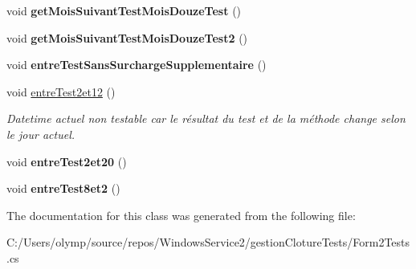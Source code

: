 \begin{DoxyCompactItemize}
\mbox{\label{classgestion_cloture_1_1_tests_1_1_form2_tests_ae8718aa9efe29a05e9a40a439a937639}} 
void {\bfseries get\+Mois\+Suivant\+Test\+Mois\+Douze\+Test} ()
\item 
\mbox{\label{classgestion_cloture_1_1_tests_1_1_form2_tests_a5f1d13e84b2452a2d848c311aa3b92c7}} 
void {\bfseries get\+Mois\+Suivant\+Test\+Mois\+Douze\+Test2} ()
\item 
\mbox{\label{classgestion_cloture_1_1_tests_1_1_form2_tests_a5f6df5b86baccd92be6cd8cd98c430fa}} 
void {\bfseries entre\+Test\+Sans\+Surcharge\+Supplementaire} ()
\item 
\mbox{\label{classgestion_cloture_1_1_tests_1_1_form2_tests_ad3fa2668c049d4801c7c19ec2248b736}} 
void \mbox{\hyperlink{classgestion_cloture_1_1_tests_1_1_form2_tests_ad3fa2668c049d4801c7c19ec2248b736}{entre\+Test2et12}} ()
\begin{DoxyCompactList}\small\item\em Datetime actuel non testable car le résultat du test et de la méthode change selon le jour actuel. \end{DoxyCompactList}\item 
\mbox{\label{classgestion_cloture_1_1_tests_1_1_form2_tests_a0f6b1466c06393f9fcfcd780c0b607a9}} 
void {\bfseries entre\+Test2et20} ()
\item 
\mbox{\label{classgestion_cloture_1_1_tests_1_1_form2_tests_a9008295c5e26657b549a34892b73ade9}} 
void {\bfseries entre\+Test8et2} ()
\end{DoxyCompactItemize}


The documentation for this class was generated from the following file\+:\begin{DoxyCompactItemize}
\item 
C\+:/\+Users/olymp/source/repos/\+Windows\+Service2/gestion\+Cloture\+Tests/Form2\+Tests.\+cs\end{DoxyCompactItemize}
